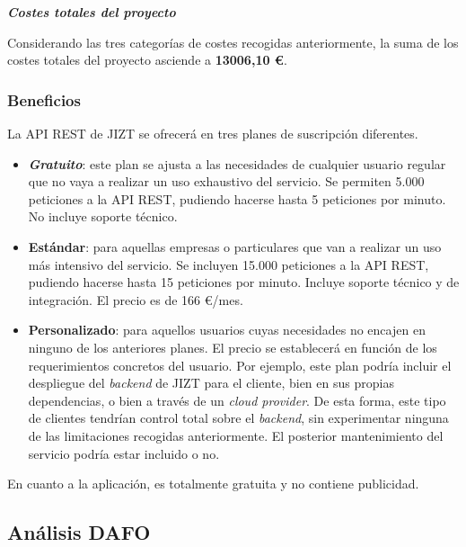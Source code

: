 \noindent
\textbf{\emph{Costes totales del proyecto}}

Considerando las tres categorías de costes recogidas anteriormente, la suma de los costes totales del proyecto asciende a \textbf{13006,10 €}.

\newpage

\subsubsection{Beneficios}

La API REST de JIZT se ofrecerá en tres planes de suscripción diferentes.

\vspace{-0.3cm}
\begin{itemize}[\textbullet]
	\item \textbf{\emph{Gratuito}}: este plan se ajusta a las necesidades de cualquier usuario regular que no vaya a realizar un uso exhaustivo del servicio. Se permiten 5.000 peticiones a la API REST, pudiendo hacerse hasta 5 peticiones por minuto. No incluye soporte técnico.
	
	\item \textbf{Estándar}: para aquellas empresas o particulares que van a realizar un uso más intensivo del servicio. Se incluyen 15.000 peticiones a la API REST, pudiendo hacerse hasta 15 peticiones por minuto. Incluye soporte técnico y de integración. El precio es de 166 €/mes.
	
	\item \textbf{Personalizado}: para aquellos usuarios cuyas necesidades no encajen en ninguno de los anteriores planes. El precio se establecerá en función de los requerimientos concretos del usuario. Por ejemplo, este plan podría incluir el despliegue del \emph{backend} de JIZT para el cliente, bien en sus propias dependencias, o bien a través de un \emph{cloud provider}. De esta forma, este tipo de clientes tendrían control total sobre el \emph{backend}, sin experimentar ninguna de las limitaciones recogidas anteriormente. El posterior mantenimiento del servicio podría estar incluido o no.
\end{itemize}

En cuanto a la aplicación, es totalmente gratuita y no contiene publicidad.

\newpage
\subsection{Análisis DAFO}


